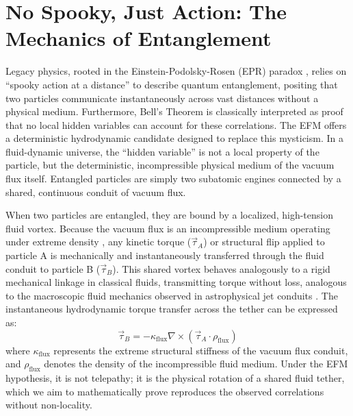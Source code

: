 \documentclass[11pt, a4paper]{article}
\begin{document}
\section{No Spooky, Just Action: The Mechanics of Entanglement}
  Legacy physics, rooted in the Einstein-Podolsky-Rosen (EPR) paradox \cite{epr1935}, relies on ``spooky action at a distance'' to describe quantum entanglement, positing that two particles communicate instantaneously across vast distances without a physical medium. Furthermore, Bell's Theorem \cite{bell1964} is classically interpreted as proof that no local hidden variables can account for these correlations. The EFM offers a deterministic hydrodynamic candidate designed to replace this mysticism. In a fluid-dynamic universe, the ``hidden variable'' is not a local property of the particle, but the deterministic, incompressible physical medium of the vacuum flux itself. Entangled particles are simply two subatomic engines connected by a shared, continuous conduit of vacuum flux.
  
  When two particles are entangled, they are bound by a localized, high-tension fluid vortex. Because the vacuum flux is an incompressible medium operating under extreme density \cite{marabut2026m8}, any kinetic torque ($\vec{\tau}_{A}$) or structural flip applied to particle A is mechanically and instantaneously transferred through the fluid conduit to particle B ($\vec{\tau}_{B}$). This shared vortex behaves analogously to a rigid mechanical linkage in classical fluids, transmitting torque without loss, analogous to the macroscopic fluid mechanics observed in astrophysical jet conduits \cite{marabut2026m3}. The instantaneous hydrodynamic torque transfer across the tether can be expressed as:
  \begin{equation}
    \vec{\tau}_{B} = - \kappa_{\text{flux}} \nabla \times (\vec{\tau}_{A} \cdot \rho_{\text{flux}})
  \end{equation}
  where $\kappa_{\text{flux}}$ represents the extreme structural stiffness of the vacuum flux conduit, and $\rho_{\text{flux}}$ denotes the density of the incompressible fluid medium. Under the EFM hypothesis, it is not telepathy; it is the physical rotation of a shared fluid tether, which we aim to mathematically prove reproduces the observed correlations without non-locality.

\end{document}
